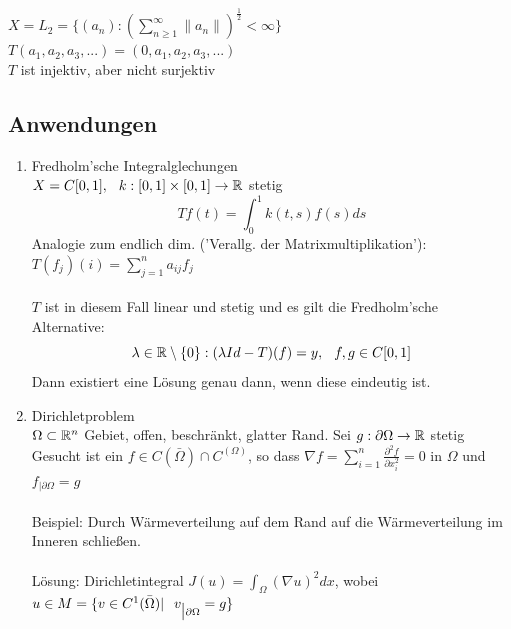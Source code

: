 \begin{beispiel}
$X = L_{2} = \{ (a_{n}): \left( \sum_{n \geq 1}^{\infty} \| a_{n} \| \right)^{\frac{1}{2}} < \infty \}$	\\
$T ( a_{1}, a_{2}, a_{3}, ...) = ( 0, a_{1}, a_{2}, a_{3}, ...)$ \\

$T$ ist injektiv, aber nicht surjektiv
\end{beispiel}

\subsection{Anwendungen}

\begin{enumerate}
	\item Fredholm'sche Integralglechungen  \\
	$X = C[0, 1], \hspace{0.25cm} k: [0, 1] \times [0, 1] \rightarrow \mathbb{R}$ stetig \\
	\[ Tf(t) = \int_{0}^{1} k(t, s) f(s) ds \]
	Analogie zum endlich dim. ('Verallg. der Matrixmultiplikation'):  $ T(f_{j})(i) = \sum_{j = 1}^{n} a_{ij}f_{j}$ \\ \\
 	$T$ ist in diesem Fall linear und stetig und es gilt die Fredholm'sche Alternative:
	\[ \lambda \in \mathbb{R} \setminus \{0\}: (\lambda Id - T)(f) = y, \hspace{0.25cm} f,g \in C[0, 1] \]
	Dann existiert eine Lösung genau dann, wenn diese eindeutig ist. \\
	\item Dirichletproblem \\
	$\Omega \subset \mathbb{R}^n$ Gebiet, offen, beschränkt, glatter Rand. Sei $g: \partial \Omega \rightarrow \mathbb{R}$ stetig \\ 
	Gesucht ist ein $f \in C(\bar \Omega) \cap  C^(\Omega)$, so dass $\nabla f = \sum_{i = 1}^{n} \frac{\partial^{2} f}{\partial x_{i}^2} = 0$ in $\Omega$ und $f_{\big| \partial \Omega}= g$ \\ \\
	Beispiel: Durch Wärmeverteilung auf dem Rand auf die Wärmeverteilung im Inneren schlie{\ss}en. \\ \\
	Lösung: Dirichletintegral $J(u) = \int_{\Omega} (\nabla u )^{2} dx$, wobei $ u \in M = \{ v \in C^{1}(\bar \Omega) | \hspace{0.25cm} v_{\big| \partial \Omega} = g \}$ \\

\end{enumerate}
